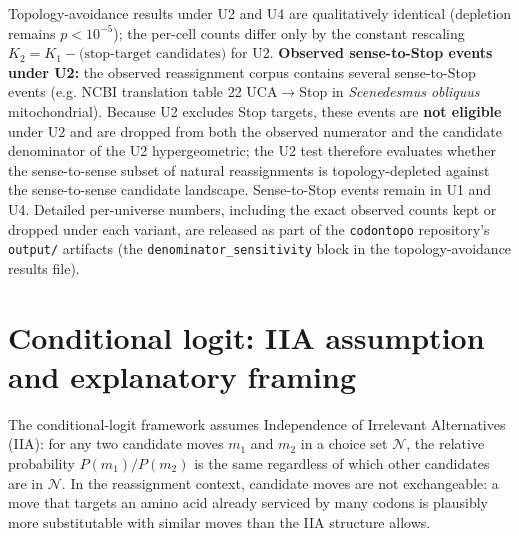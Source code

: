 \documentclass[preprint,11pt,authoryear,a4paper]{elsarticle}
\begin{document}
\protect{}\label{tbl:s-denominators}{}

Topology-avoidance results under U2 and U4 are qualitatively identical
(depletion remains \(p < 10^{- 5}\)); the per-cell counts differ only by
the constant rescaling
\(K_{2} = K_{1} - \text{(stop-target candidates)}\) for U2.
\textbf{Observed sense-to-Stop events under U2:} the observed
reassignment corpus contains several sense-to-Stop events (e.g. NCBI
translation table 22 UCA\(\rightarrow\)Stop in \emph{Scenedesmus
obliquus} mitochondrial). Because U2 excludes Stop targets, these events
are \textbf{not eligible} under U2 and are dropped from both the
observed numerator and the candidate denominator of the U2
hypergeometric; the U2 test therefore evaluates whether the
sense-to-sense subset of natural reassignments is topology-depleted
against the sense-to-sense candidate landscape. Sense-to-Stop events
remain in U1 and U4. Detailed per-universe numbers, including the exact
observed counts kept or dropped under each variant, are released as part
of the \texttt{codontopo} repository's \texttt{output/} artifacts (the
\texttt{denominator\_sensitivity} block in the topology-avoidance
results file).

\section{Conditional logit: IIA assumption and explanatory
framing}\label{sec:s-iia}

The conditional-logit framework assumes Independence of Irrelevant
Alternatives (IIA): for any two candidate moves \(m_{1}\) and \(m_{2}\)
in a choice set \(\mathcal{N}\), the relative probability
\(P\left( m_{1} \right)/P\left( m_{2} \right)\) is the same regardless
of which other candidates are in \(\mathcal{N}\). In the reassignment
context, candidate moves are not exchangeable: a move that targets an
amino acid already serviced by many codons is plausibly more
substitutable with similar moves than the IIA structure allows.
\end{document}
